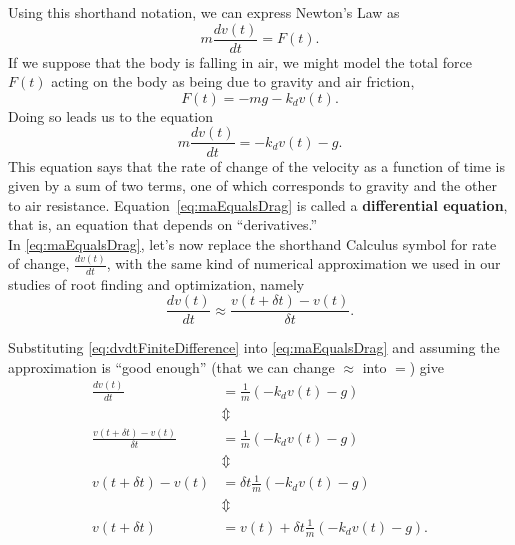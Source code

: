 Using this shorthand notation, we can express Newton's Law as
\begin{equation}
    m \frac{dv(t)}{dt} =  F(t).  %
\end{equation}
If we suppose that the body is falling in air, we might model the total force $F(t)$ acting on the body as being due to gravity and air friction, 
$$F(t) =  -mg -k_d v(t). $$
Doing so leads us to the equation
\begin{equation}
\label{eq:maEqualsDrag}
    \boxed{m\frac{dv(t)}{dt} = - k_d v(t) -g }.
\end{equation}
This equation says that the rate of change of the velocity as a function of time is given by a sum of two terms, one of which corresponds to gravity and the other to air resistance.
Equation~\eqref{eq:maEqualsDrag} is called a \textbf{differential equation}, that is, an equation that depends on ``derivatives.''\\

In \eqref{eq:maEqualsDrag}, let's now replace the shorthand Calculus symbol for rate of change, $\frac{dv(t)}{dt}$, with the same kind of numerical approximation we used in our studies of root finding and optimization, namely
\begin{equation}
\label{eq:dvdtFiniteDifference}
\frac{dv(t)}{dt} \approx \frac{v(t+\delta t)-v(t)}{\delta t}.
\end{equation}

Substituting \eqref{eq:dvdtFiniteDifference} into \eqref{eq:maEqualsDrag} and assuming the approximation is ``good enough'' (that we can change $\approx$ into $=$) give
\begin{equation}
\label{eq:maEqualsDragDiffrenceEq}
\begin{aligned}
\frac{dv(t)}{dt}  &= \frac{1}{m} \left( - k_d v(t) -g \right) \\
& \Updownarrow \\
    \frac{v(t+\delta t)-v(t)}{\delta t}& = \frac{1}{m} \left(- k_d v(t) -g \right) \\
    & \Updownarrow \\
  v(t+\delta t)-v(t) & = \delta t \frac{1}{m} \left(- k_d v(t) -g \right)\\
   & \Updownarrow \\
  v(t+\delta t) & = v(t) + \delta t \frac{1}{m} \left(- k_d v(t) -g \right).
  \end{aligned}
\end{equation}


